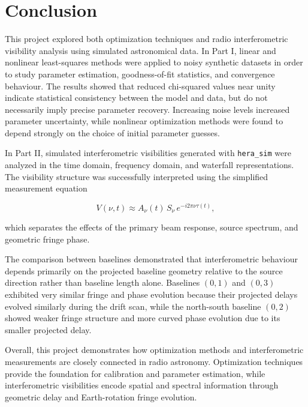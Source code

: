 \documentclass{article}
\begin{document}
\section{Conclusion}

This project explored both optimization techniques and radio interferometric visibility analysis using simulated astronomical data. In Part I, linear and nonlinear least-squares methods were applied to noisy synthetic datasets in order to study parameter estimation, goodness-of-fit statistics, and convergence behaviour. The results showed that reduced chi-squared values near unity indicate statistical consistency between the model and data, but do not necessarily imply precise parameter recovery. Increasing noise levels increased parameter uncertainty, while nonlinear optimization methods were found to depend strongly on the choice of initial parameter guesses.

In Part II, simulated interferometric visibilities generated with \texttt{hera\_sim} were analyzed in the time domain, frequency domain, and waterfall representations. The visibility structure was successfully interpreted using the simplified measurement equation

\[
V(\nu,t) \approx A_\nu(t)\,S_\nu\,e^{-i2\pi\nu\tau(t)},
\]

which separates the effects of the primary beam response, source spectrum, and geometric fringe phase.

The comparison between baselines demonstrated that interferometric behaviour depends primarily on the projected baseline geometry relative to the source direction rather than baseline length alone. Baselines $(0,1)$ and $(0,3)$ exhibited very similar fringe and phase evolution because their projected delays evolved similarly during the drift scan, while the north-south baseline $(0,2)$ showed weaker fringe structure and more curved phase evolution due to its smaller projected delay.

Overall, this project demonstrates how optimization methods and interferometric measurements are closely connected in radio astronomy. Optimization techniques provide the foundation for calibration and parameter estimation, while interferometric visibilities encode spatial and spectral information through geometric delay and Earth-rotation fringe evolution.
\end{document}
